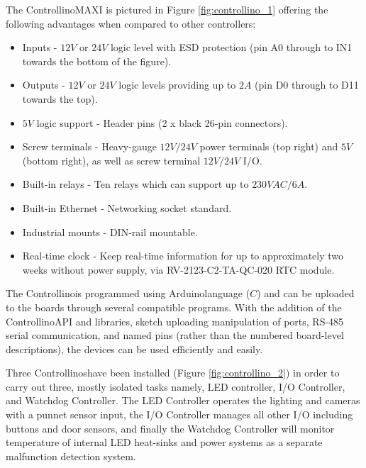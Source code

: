 \documentclass[fleqn,twoside,12pt]{report}
\begin{document}
The Controllino\texttrademark MAXI is pictured in Figure \ref{fig:controllino_1} offering the following advantages when compared to other controllers:


\begin{itemize}
	\item Inputs - $12V$ or $24V$ logic level with ESD protection (pin A0 through to IN1 towards the bottom of the figure). 
	\item Outputs - $12V$ or $24V$ logic levels providing up to $2A$ (pin D0 through to D11 towards the top).
	\item $5V$ logic support - Header pins (2 x black 26-pin connectors). 
	\item Screw terminals - Heavy-gauge $12V/24V$ power terminals (top right) and $5V$ (bottom right), as well as screw terminal $12V/24V$ I/O. 
	\item Built-in relays - Ten relays which can support up to $230VAC/6A$.
	\item Built-in Ethernet - Networking socket standard.
	\item Industrial mounts - DIN-rail mountable. 
	\item Real-time clock - Keep real-time information for up to approximately two weeks without power supply, via RV-2123-C2-TA-QC-020 RTC module.
\end{itemize}

The Controllino\texttrademark is programmed using Arduino\texttrademark language ($C$) and can be uploaded to the boards through several compatible programs. With the addition of the Controllino\texttrademark API and libraries, sketch uploading manipulation of ports, RS-485 serial communication, and named pins (rather than the numbered board-level descriptions), the devices can be used efficiently and easily.

Three Controllinos\texttrademark have been installed (Figure \ref{fig:controllino_2}) in order to carry out three, mostly isolated tasks namely, LED controller, I/O Controller, and Watchdog Controller. The LED Controller operates the lighting and cameras with a punnet sensor input, the I/O Controller manages all other I/O including buttons and door sensors, and finally the Watchdog Controller will monitor temperature of internal LED heat-sinks and power systems as a separate malfunction detection system.
\end{document}

